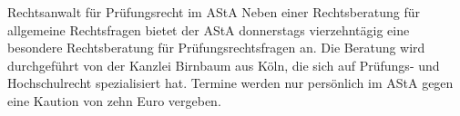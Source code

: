 \begin{artikel}{Rechtsanwalt für Prüfungsrecht im AStA}
Neben einer Rechtsberatung für allgemeine Rechtsfragen bietet der AStA donnerstags vierzehntägig eine besondere Rechtsberatung für Prüfungsrechtsfragen an. Die Beratung wird durchgeführt von der Kanzlei Birnbaum aus Köln, die sich auf Prüfungs- und Hochschulrecht spezialisiert hat. Termine werden nur persönlich im AStA gegen eine Kaution von zehn Euro vergeben.
\end{artikel}

